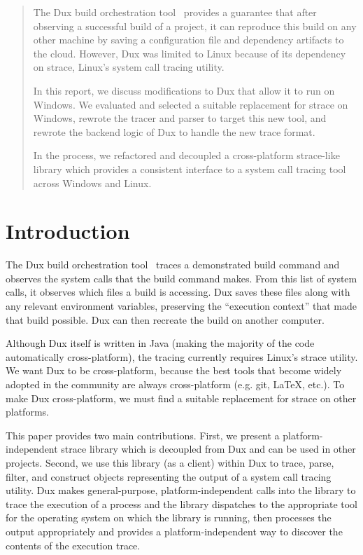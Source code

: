 \documentclass[10pt,conference]{IEEEtran}
\begin{document}
\maketitle

\lstset{language=bash}

\begin{abstract}

The Dux build orchestration tool~\cite{dux} provides a guarantee that
after observing a successful build of a project, it can reproduce this build on
any other machine by saving a configuration file and dependency artifacts
to the cloud. However, Dux was limited to Linux because of its dependency on strace,
Linux's system call tracing utility.

In this report, we discuss modifications to Dux that allow it to run on Windows. 
We evaluated and selected a suitable replacement for strace on Windows, rewrote
the tracer and parser to target this new tool, and rewrote the backend logic of
Dux to handle the new trace format.

In the process, we refactored and decoupled a cross-platform strace-like library
which provides a consistent interface to a system call tracing tool across
Windows and Linux.

\end{abstract}

\section{Introduction}

The Dux build orchestration tool~\cite{dux} traces a demonstrated build command
and observes the system calls that the build command makes. From this list of
system calls, it observes which files a build is accessing. Dux saves these files along
with any relevant environment variables, preserving the ``execution context'' that
made that build possible. Dux can then recreate the build on another computer. 

Although Dux itself is written in Java (making the majority of the code
automatically cross-platform), the tracing currently requires Linux's strace utility. 
We want Dux to be cross-platform, because the best tools that become
widely adopted in the community are always cross-platform (e.g. git, LaTeX, etc.).
To make Dux cross-platform, we must find a suitable replacement
for strace on other platforms. 

This paper provides two main contributions. First, we present a platform-independent
strace library which is decoupled from Dux and can be used in other projects.
Second, we use this library (as a client) within Dux to trace, parse, filter, and
construct objects representing the output of a system call tracing utility. Dux
makes general-purpose, platform-independent calls into the library to trace
the execution of a process and the library dispatches to the appropriate tool
for the operating system on which the library is running, then processes the
output appropriately and provides a platform-independent way to discover the
contents of the execution trace.
\end{document}
